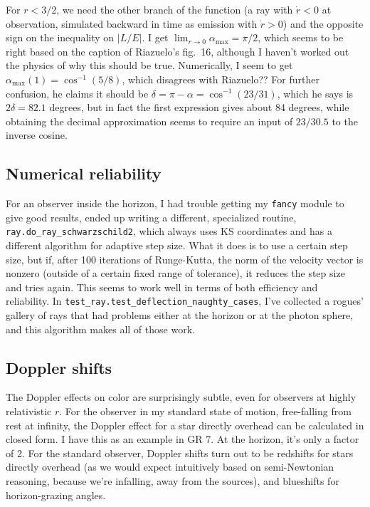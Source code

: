 \documentclass{article}
\begin{document}
For $r<3/2$, we need the other branch of the function 
(a ray with $\dot{r}<0$ at observation, simulated backward in time as emission with $\dot{r}>0$)
and the opposite sign on the inequality on $|L/E|$.
I get $\lim_{r\rightarrow 0}\alpha_\text{max}=\pi/2$,
which seems to be right based on the caption of Riazuelo's fig.~16, although I haven't worked out the
physics of why this should be true. Numerically, I seem to
get $\alpha_\text{max}(1)=\cos^{-1}(5/8)$, which disagrees with
Riazuelo?? For further confusion, he claims it should be $\delta=\pi-\alpha=\cos^{-1}(23/31)$,
which he says is $2\delta=82.1$ degrees, but in fact the first expression gives about 84 degrees,
while obtaining the decimal approximation seems to require an input of $23/30.5$ to the inverse cosine.

\subsection{Numerical reliability}

For an observer inside the horizon, I had trouble getting my \texttt{fancy} module to give good
results, ended up writing a different, specialized routine, \texttt{ray.do\_ray\_schwarzschild2}, which always
uses KS coordinates and has a different algorithm for adaptive step size. What it does is to use
a certain step size, but if, after 100 iterations of Runge-Kutta, the norm of the velocity vector
is nonzero (outside of a certain fixed range of tolerance), it reduces the step size and tries again.
This seems to work well in terms of both efficiency and reliability.
In \texttt{test\_ray.test\_deflection\_naughty\_cases}, I've collected a rogues' gallery of rays that
had problems either at the horizon or at the photon sphere, and this algorithm makes all of those
work.

\subsection{Doppler shifts}

The Doppler effects on color are surprisingly subtle, even for observers at highly relativistic $r$.
For the observer in my standard state of motion, free-falling from rest at infinity, the Doppler
effect for a star directly overhead can be calculated in closed form. I have this as an example
in GR 7. At the horizon, it's only a factor of 2. For the standard observer,
Doppler shifts turn out to be redshifts for stars
directly overhead (as we would expect intuitively based on semi-Newtonian reasoning, because
we're infalling, away from the sources), and blueshifts for horizon-grazing angles.
\end{document}

